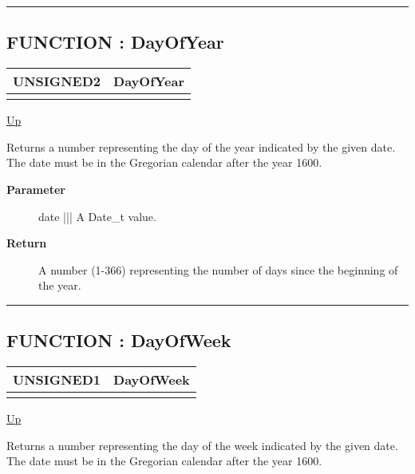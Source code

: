 \rule{\textwidth}{0.4pt}
\subsection*{FUNCTION : DayOfYear}
\hypertarget{ecldoc:date.dayofyear}{}

{\renewcommand{\arraystretch}{1.5}
\begin{tabularx}{\textwidth}{|>{\raggedright\arraybackslash}l|X|}
\hline
\hspace{0pt}UNSIGNED2 & DayOfYear \\
\hline
\multicolumn{2}{|>{\raggedright\arraybackslash}X|}{\hspace{0pt}(Date\_t date)} \\
\hline
\end{tabularx}
}

\hyperlink{ecldoc:Date}{Up}

\par
Returns a number representing the day of the year indicated by the given date. The date must be in the Gregorian calendar after the year 1600.

\par
\begin{description}
\item [\textbf{Parameter}] date ||| A Date\_t value.
\item [\textbf{Return}] A number (1-366) representing the number of days since the beginning of the year.
\end{description}

\rule{\textwidth}{0.4pt}
\subsection*{FUNCTION : DayOfWeek}
\hypertarget{ecldoc:date.dayofweek}{}

{\renewcommand{\arraystretch}{1.5}
\begin{tabularx}{\textwidth}{|>{\raggedright\arraybackslash}l|X|}
\hline
\hspace{0pt}UNSIGNED1 & DayOfWeek \\
\hline
\multicolumn{2}{|>{\raggedright\arraybackslash}X|}{\hspace{0pt}(Date\_t date)} \\
\hline
\end{tabularx}
}

\hyperlink{ecldoc:Date}{Up}

\par
Returns a number representing the day of the week indicated by the given date. The date must be in the Gregorian calendar after the year 1600.

